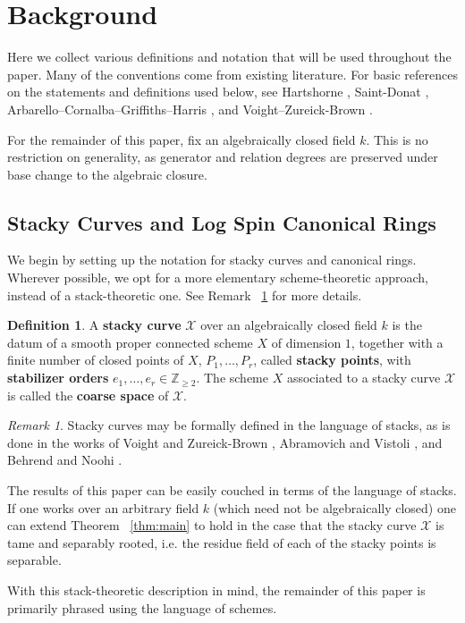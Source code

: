 \documentclass{amsart}
\theoremstyle{plain}
\theoremstyle{definition}
\newtheorem{defn}[thm]{Definition}
\theoremstyle{remark}
\newtheorem{rem}[thm]{Remark}
\numberwithin{equation}{section}
\newcommand\ssec{\subsection}
\newcommand\BZ{{\mathbb Z}}
\newcommand\sx{\mathscr X}
\begin{document}

\section{Background}
\label{sec:background}
Here we collect various definitions and notation that will be
used throughout the paper. Many of the conventions come from existing
literature. For basic references on the statements and definitions
used below, see Hartshorne \cite[Chapter IV]{hartshorne:ag},
Saint-Donat \cite{saint-donat:proj}, Arbarello--Cornalba--Griffiths--Harris 
\cite[Section III.2]
{acgh:algebraic-curves}, and Voight--Zureick-Brown \cite[Chapter 2,
Chapter 5]{vzb:stacky}.

For the remainder of this paper, fix an algebraically closed field $k$.
This is no restriction on generality, as generator and relation degrees are preserved under base change to the algebraic closure.

\ssec{Stacky Curves and Log Spin Canonical Rings}
\label{ssec:stacky-background}
We begin by setting up the notation for stacky curves and canonical rings. Wherever possible, we opt for a more elementary scheme-theoretic approach, instead of a stack-theoretic one. See Remark ~\ref{rem:stack-formalism} for more details.

\begin{defn}
\label{defn:stacky-curve}
A \textbf{stacky curve} $\sx$ over an algebraically closed field $k$ is the datum of a smooth proper connected scheme $X$ of dimension $1$, together with a finite number of closed points of $X$, $P_1, \ldots, P_r$, called {\bf stacky points}, with {\bf stabilizer orders} $e_1, \ldots, e_r \in \BZ_{\geq 2}.$ The scheme $X$ associated to a stacky curve $\sx$ is called the {\bf coarse space} of $\sx$.

\end{defn}

\begin{rem}
\label{rem:stack-formalism}
Stacky curves may be formally defined in the language of stacks, as
is done in the works of Voight and Zureick-Brown \cite{vzb:stacky},
Abramovich and Vistoli \cite{abramovich-vistoli:compactifying}, and
Behrend and Noohi \cite{behrend-noohi:uniformization}.

The results of this paper can be easily couched in terms of the language of stacks. If one works over an arbitrary field $k$ (which need not be algebraically closed) one can extend Theorem ~\ref{thm:main} to hold in the case that the stacky curve $\sx$ is tame and separably rooted, i.e. the residue field of each
of the stacky points is separable.

With this stack-theoretic description in mind, the remainder of this paper is primarily phrased using the language
of schemes.
\end{rem}
\end{document}
